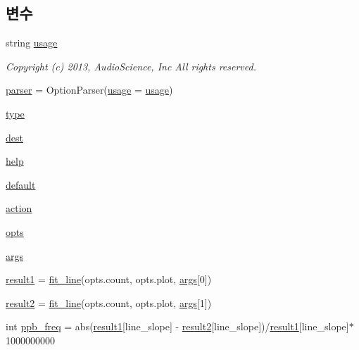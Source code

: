 \subsection*{변수}
\begin{DoxyCompactItemize}
\item 
string \hyperlink{namespaceastime__fitline_a61e5f066c879e5430d8f713c2c3a8b31}{usage}
\begin{DoxyCompactList}\small\item\em Copyright (c) 2013, Audio\+Science, Inc All rights reserved. \end{DoxyCompactList}\item 
\hyperlink{namespaceastime__fitline_a90eee7a4677ca8b1ed116364a24367f9}{parser} = Option\+Parser(\hyperlink{namespaceastime__fitline_a61e5f066c879e5430d8f713c2c3a8b31}{usage} = \hyperlink{namespaceastime__fitline_a61e5f066c879e5430d8f713c2c3a8b31}{usage})
\item 
\hyperlink{namespaceastime__fitline_a7aead736a07eaf25623ad7bfa1f0ee2d}{type}
\item 
\hyperlink{namespaceastime__fitline_ab0bede79c5f4cbed9c2cd932a0ace201}{dest}
\item 
\hyperlink{namespaceastime__fitline_a81ae9faedaa69e3e28e2960a0548df8d}{help}
\item 
\hyperlink{namespaceastime__fitline_affb1327b18bf08a379d19eef89cf1ed1}{default}
\item 
\hyperlink{namespaceastime__fitline_a2f4ab7bf743142dae2e459aa18f9f1d4}{action}
\item 
\hyperlink{namespaceastime__fitline_aa17b9f50d41f0a8e95659986136435dd}{opts}
\item 
\hyperlink{namespaceastime__fitline_a8187411843a6284ffb964ef3fb9fcab3}{args}
\item 
\hyperlink{namespaceastime__fitline_abdd1d9839bb21323e0874f563b0966b7}{result1} = \hyperlink{namespaceastime__fitline_aa22d126809119d4540a1f8700dbebf88}{fit\+\_\+line}(opts.\+count, opts.\+plot, \hyperlink{namespaceastime__fitline_a8187411843a6284ffb964ef3fb9fcab3}{args}\mbox{[}0\mbox{]})
\item 
\hyperlink{namespaceastime__fitline_a4d090241b41b5d54f7f0a525d6d171f6}{result2} = \hyperlink{namespaceastime__fitline_aa22d126809119d4540a1f8700dbebf88}{fit\+\_\+line}(opts.\+count, opts.\+plot, \hyperlink{namespaceastime__fitline_a8187411843a6284ffb964ef3fb9fcab3}{args}\mbox{[}1\mbox{]})
\item 
int \hyperlink{namespaceastime__fitline_a3fedec52db0923da2f5b1e4f3ce91eab}{ppb\+\_\+freq} = abs(\hyperlink{namespaceastime__fitline_abdd1d9839bb21323e0874f563b0966b7}{result1}\mbox{[}\textquotesingle{}line\+\_\+slope\textquotesingle{}\mbox{]} -\/ \hyperlink{namespaceastime__fitline_a4d090241b41b5d54f7f0a525d6d171f6}{result2}\mbox{[}\textquotesingle{}line\+\_\+slope\textquotesingle{}\mbox{]})/\hyperlink{namespaceastime__fitline_abdd1d9839bb21323e0874f563b0966b7}{result1}\mbox{[}\textquotesingle{}line\+\_\+slope\textquotesingle{}\mbox{]}$\ast$1000000000

\end{DoxyCompactItemize}
